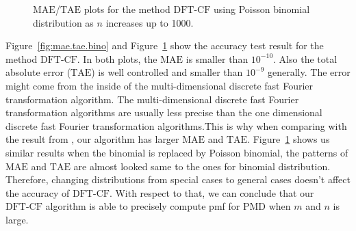 \documentclass[12pt]{article}
\newcommand{\TAE}{{\textrm{TAE}}}
\newcommand{\MAE}{{\textrm{MAE}}}
\newcommand{\PMD}{\textrm{PMD}}
\newcommand{\dft}{{\textrm{DFT-CF}}}
\begin{document}
\begin{figure}
\begin{minipage}{0.45\textwidth}
    \end{minipage}
    \caption{$\MAE$/$\TAE$ plots for the method $\dft$ using Poisson binomial distribution as $n$ increases up to 1000.}
    \label{fig:mae.tae.poi}
\end{figure}

Figure~\ref{fig:mae.tae.bino} and Figure~\ref{fig:mae.tae.poi} show the accuracy test result for the method $\dft$. In both plots, the $\MAE$ is smaller than $10^{-10}$. Also the total absolute error ($\TAE$) is well controlled and smaller than $10^{-9}$ generally. The error might come from the inside of the multi-dimensional discrete fast Fourier transformation algorithm. The multi-dimensional discrete fast Fourier transformation algorithms are usually less precise than the one dimensional discrete fast Fourier transformation algorithms.This is why when comparing with the result from , our algorithm has larger $\MAE$ and $\TAE$. Figure~\ref{fig:mae.tae.poi} shows us similar results when the binomial is replaced by Poisson binomial, the patterns of $\MAE$ and $\TAE$ are almost looked same to the ones for binomial distribution. Therefore, changing distributions from special cases to general cases doesn't affect the accuracy of $\dft$. With respect to that, we can conclude that our $\dft$ algorithm is able to precisely compute pmf for $\PMD$ when $m$ and $n$ is large.
\end{document}
